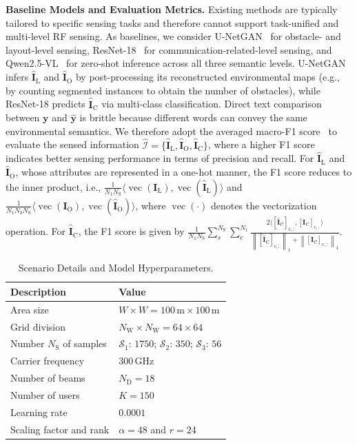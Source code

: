 \documentclass[journal,10pt,twocolumn]{IEEEtran}
\newcommand\IC{\ensuremath{\mathcal{I}}}
\newcommand\SC{\ensuremath{\mathcal{S}}}
\newcommand\yB{\ensuremath{\bm{y}}}
\newcommand\FIF{\ensuremath{\mathbf{I}}}
\newcommand\CR{\ensuremath{\mathrm{C}}}
\newcommand\DR{\ensuremath{\mathrm{D}}}
\newcommand\LR{\ensuremath{\mathrm{L}}}
\newcommand\ROR{\ensuremath{\mathrm{O}}}
\newcommand\SR{\ensuremath{\mathrm{S}}}
\newcommand\WR{\ensuremath{\mathrm{W}}}
\newcommand{\wh}{\widehat}
\begin{document}
{\bf Baseline Models and Evaluation Metrics.} 
Existing methods are typically tailored to specific sensing tasks and therefore cannot support task-unified and multi-level RF sensing. As baselines, we consider U-NetGAN~\cite{hu2025advancing} for obstacle- and layout-level sensing, ResNet-18~\cite{7780459} for communication-related-level sensing, and  Qwen2.5-VL~\cite{bai2025qwen2} for zero-shot inference across all three semantic levels. U-NetGAN infers $\wh{\FIF}_{\LR}$ and $\wh{\FIF}_{\ROR}$ by post-processing its reconstructed environmental maps (e.g., by counting segmented instances to obtain the number of obstacles), while ResNet-18 predicts $\wh{\FIF}_{\CR}$ via multi-class classification. Direct text comparison between $\yB$ and $\wh{\yB}$ is brittle because different words can convey the same environmental semantics. We therefore adopt the averaged macro-F1 score~\cite{11200914} to evaluate the sensed information $\wh{\IC}=\{\wh{\FIF}_{\LR},\wh{\FIF}_{\ROR},\wh{\FIF}_{\CR}\}$, where a higher F1 score indicates better sensing performance in terms of precision and recall. For $\wh{\FIF}_{\LR}$ and $\wh{\FIF}_{\ROR}$, whose attributes are represented in a one-hot manner, the F1 score reduces to the inner product, i.e., $\frac{1}{N_{1}N_{\SR}}\langle\operatorname{vec}(\FIF_{\LR}), \operatorname{vec}(\wh{\FIF}_{\LR})\rangle$ and $\frac{1}{N_{1}N_{3}N_{\SR}}\langle\operatorname{vec}(\FIF_{\ROR}), \operatorname{vec}(\wh{\FIF}_{\ROR})\rangle$, where $\operatorname{vec}(\cdot)$ denotes the vectorization operation. For $\wh{\FIF}_{\CR}$, the F1 score is given by $\frac{1}{N_{1}N_{\SR}}\sum_{s}^{N_{\SR}}\sum_{c}^{N_{1}}\frac{2\langle [\wh{\FIF}_{\CR}]_{c,:},[\FIF_{\CR}]_{c,:}  \rangle}{\left\|[\wh{\FIF}_{\CR}]_{c,:}\right\|_1+\left\|[\FIF_{\CR}]_{c,:}\right\|_1}$.

\renewcommand{\arraystretch}{1.3}   %
\setlength{\tabcolsep}{5pt}          %

\begin{table}[htbp]
\centering
\caption{Scenario Details and Model Hyperparameters.}
\label{tab_evalution}

\begin{tabular}{
  >{\centering\arraybackslash}p{}|
  >{\centering\arraybackslash}p{}}\hline
\textbf{Description} & \textbf{Value} \\\hline
Area size & $W\times W=100\,\mathrm{m}\times100\,\mathrm{m}$ \\\hline
Grid division & $N_{\WR}\times N_{\WR}=64\times64$ \\\hline
Number $N_{\SR}$ of samples
  & $\SC_1$: $1750$; $\SC_2$: $350$; $\SC_3$: $56$ \\\hline
Carrier frequency & $300\,\mathrm{GHz}$ \\\hline
Number of beams & $N_{\DR}=18$ \\\hline
Number of users & $K=150$  \\\hline
Learning rate & $0.0001$ \\\hline
Scaling factor and rank & $\alpha=48$ and $r=24$ \\\hline
\end{tabular}
\end{table}
\end{document}
